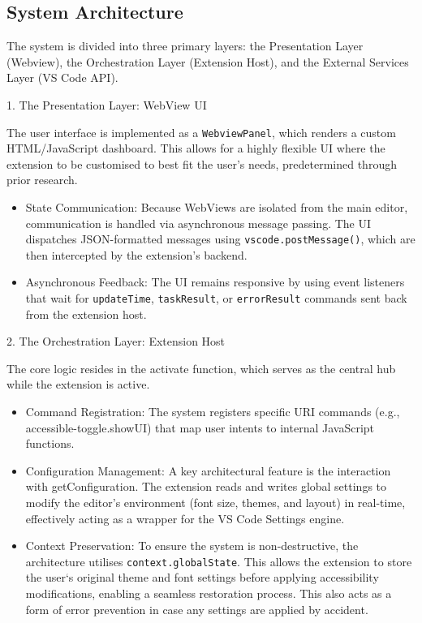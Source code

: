\subsection{System Architecture}
The system is divided into three primary layers: the Presentation Layer (Webview), the Orchestration Layer (Extension Host), and the External Services Layer (VS Code \gls{API}).

1. The Presentation Layer: WebView UI

The user interface is implemented as a \texttt{WebviewPanel}, which renders a custom HTML/JavaScript dashboard. This allows for a highly flexible UI where the extension to be customised to best fit the user's needs, predetermined through prior research.

\begin{itemize}
    \item State Communication: Because WebViews are isolated from the main editor, communication is handled via asynchronous message passing. The UI dispatches JSON-formatted messages using \texttt{vscode.postMessage()}, which are then intercepted by the extension’s backend.
    \item Asynchronous Feedback: The UI remains responsive by using event listeners that wait for \texttt{updateTime}, \texttt{taskResult}, or \texttt{errorResult} commands sent back from the extension host.
\end{itemize}

2. The Orchestration Layer: Extension Host

The core logic resides in the activate function, which serves as the central hub while the extension is active.

\begin{itemize}
    \item Command Registration: The system registers specific URI commands (e.g., accessible-toggle.showUI) that map user intents to internal JavaScript functions.
    \item Configuration Management: A key architectural feature is the interaction with getConfiguration. The extension reads and writes global settings to modify the editor's environment (font size, themes, and layout) in real-time, effectively acting as a wrapper for the VS Code Settings engine. 
    \item Context Preservation: To ensure the system is non-destructive, the architecture utilises \texttt{context.globalState}. This allows the extension to store the user`s original theme and font settings before applying accessibility modifications, enabling a seamless restoration process. This also acts as a form of error prevention in case any settings are applied by accident.
\end{itemize}


